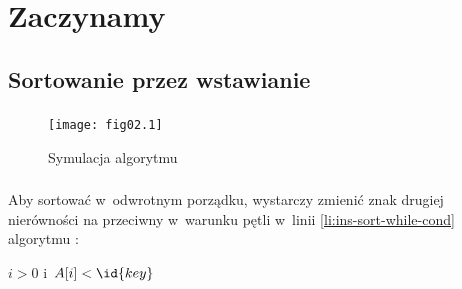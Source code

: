 \chapter{Zaczynamy}

\section{Sortowanie przez wstawianie}

\subsection{} %
\begin{figure}[h]
	\begin{center}
		\texttt{[image: fig02.1]}
	\end{center}
	\caption{Symulacja algorytmu }
\end{figure}

\subsection{} %
Aby sortować w~odwrotnym porządku, wystarczy zmienić znak drugiej nierówności na przeciwny w~warunku pętli  w~linii \ref{li:ins-sort-while-cond} algorytmu :
\begin{codebox}
\li	\While $i>0$ i~$A[i]<\id{key}$
\end{codebox}

